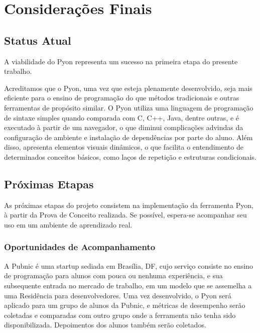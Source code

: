 \chapter[Considerações Finais]{Considerações Finais}

\section{Status Atual}

A viabilidade do Pyon representa um sucesso na primeira etapa do presente trabalho. 

Acreditamos que o Pyon, uma vez que esteja plenamente desenvolvido, seja mais eficiente para o ensino de programação do que métodos tradicionais e outras ferramentas de propósito similar.
O Pyon utiliza uma linguagem de programação de sintaxe simples quando comparada com C, C++, Java, dentre outras, e é executado à partir de um navegador, o que diminui complicações advindas da configuração de ambiente e instalação de dependências por parte do aluno. Além disso, apresenta elementos visuais dinâmicos, o que facilita o entendimento de determinados conceitos básicos, como laços de repetição e estruturas condicionais.

\section{Próximas Etapas}

As próximas etapas do projeto consistem na implementação da ferramenta Pyon, à partir da Prova de Conceito realizada. Se possível, espera-se acompanhar seu uso em um ambiente de aprendizado real.

\subsection{Oportunidades de Acompanhamento}

A Pubnic é uma startup sediada em Brasília, DF, cujo serviço consiste no ensino de
programação para alunos com pouca ou nenhuma experiência, e sua subsequente entrada no
mercado de trabalho, em um modelo que se assemelha a uma Residência para desenvolvedores.
Uma vez desenvolvido, o Pyon será aplicado para um grupo de alunos da Pubnic, e métricas de
desempenho serão coletadas e comparadas com outro grupo onde a ferramenta não tenha sido
disponibilizada. Depoimentos dos alunos também serão coletados.
